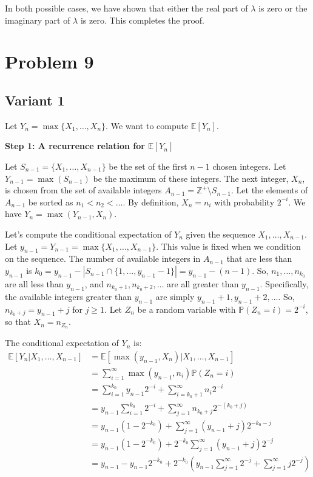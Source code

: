 \documentclass[12pt,a4paper]{article}
\theoremstyle{definition}
\begin{document}
    In both possible cases, we have shown that either the real part of $\lambda$ is zero or the imaginary part of $\lambda$ is zero. This completes the proof.

\section{Problem 9}

    \subsection{Variant 1}
        Let $Y_n = \max\{X_1, \ldots, X_n\}$. We want to compute $\mathbb{E}[Y_n]$.

        \textbf{Step 1: A recurrence relation for $\mathbb{E}[Y_n]$}

        Let $S_{n-1} = \{X_1, \ldots, X_{n-1}\}$ be the set of the first $n-1$ chosen integers.
        Let $Y_{n-1} = \max(S_{n-1})$ be the maximum of these integers.
        The next integer, $X_n$, is chosen from the set of available integers $A_{n-1} = \mathbb{Z}^+ \setminus S_{n-1}$.
        Let the elements of $A_{n-1}$ be sorted as $n_1 < n_2 < \ldots$. By definition, $X_n = n_i$ with probability $2^{-i}$.
        We have $Y_n = \max(Y_{n-1}, X_n)$.

        Let's compute the conditional expectation of $Y_n$ given the sequence $X_1, \ldots, X_{n-1}$.
        Let $y_{n-1} = Y_{n-1} = \max\{X_1, \ldots, X_{n-1}\}$. This value is fixed when we condition on the sequence.
        The number of available integers in $A_{n-1}$ that are less than $y_{n-1}$ is $k_0 = y_{n-1} - |S_{n-1} \cap \{1, \ldots, y_{n-1}-1\}| = y_{n-1} - (n-1)$.
        So, $n_1, \ldots, n_{k_0}$ are all less than $y_{n-1}$, and $n_{k_0+1}, n_{k_0+2}, \ldots$ are all greater than $y_{n-1}$.
        Specifically, the available integers greater than $y_{n-1}$ are simply $y_{n-1}+1, y_{n-1}+2, \ldots$.
        So, $n_{k_0+j} = y_{n-1}+j$ for $j \geq 1$.
        Let $Z_n$ be a random variable with $\mathbb{P}(Z_n=i)=2^{-i}$, so that $X_n=n_{Z_n}$.

        The conditional expectation of $Y_n$ is:
        \begin{align*}
            \mathbb{E}[Y_n | X_1, \ldots, X_{n-1}] &= \mathbb{E}[\max(y_{n-1}, X_n) | X_1, \ldots, X_{n-1}] \\
            &= \sum_{i=1}^{\infty} \max(y_{n-1}, n_i) \mathbb{P}(Z_n=i) \\
            &= \sum_{i=1}^{k_0} y_{n-1} 2^{-i} + \sum_{i=k_0+1}^{\infty} n_i 2^{-i} \\
            &= y_{n-1} \sum_{i=1}^{k_0} 2^{-i} + \sum_{j=1}^{\infty} n_{k_0+j} 2^{-(k_0+j)} \\
            &= y_{n-1} (1-2^{-k_0}) + \sum_{j=1}^{\infty} (y_{n-1}+j) 2^{-k_0-j} \\
            &= y_{n-1} (1-2^{-k_0}) + 2^{-k_0} \sum_{j=1}^{\infty} (y_{n-1}+j) 2^{-j} \\
            &= y_{n-1} - y_{n-1}2^{-k_0} + 2^{-k_0} \left( y_{n-1}\sum_{j=1}^{\infty} 2^{-j} + \sum_{j=1}^{\infty} j 2^{-j} \right)
        \end{align*}
\end{document}
